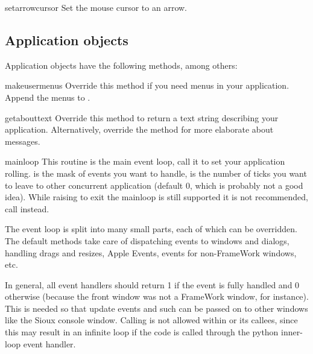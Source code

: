 \begin{funcdesc}{setarrowcursor}{}
Set the mouse cursor to an arrow.
\end{funcdesc}

\subsection{Application objects}
Application objects have the following methods, among others:

\renewcommand{\indexsubitem}{(Application method)}

\begin{funcdesc}{makeusermenus}{}
Override this method if you need menus in your application. Append the
menus to .
\end{funcdesc}

\begin{funcdesc}{getabouttext}{}
Override this method to return a text string describing your
application. Alternatively, override the  method for
more elaborate about messages.
\end{funcdesc}

\begin{funcdesc}{mainloop}{}
This routine is the main event loop, call it to set your application
rolling.  is the mask of events you want to handle,
 is the number of ticks you want to leave to other
concurrent application (default 0, which is probably not a good
idea). While raising  to exit the mainloop is still
supported it is not recommended, call  instead.

The event loop is split into many small parts, each of which can be
overridden. The default methods take care of dispatching events to
windows and dialogs, handling drags and resizes, Apple Events, events
for non-FrameWork windows, etc.

In general, all event handlers should return 1 if the event is fully
handled and 0 otherwise (because the front window was not a FrameWork
window, for instance). This is needed so that update events and such
can be passed on to other windows like the Sioux console window.
Calling  is not allowed within 
or its callees, since this may result in an infinite loop if the
code is called through the python inner-loop event handler.
\end{funcdesc}

